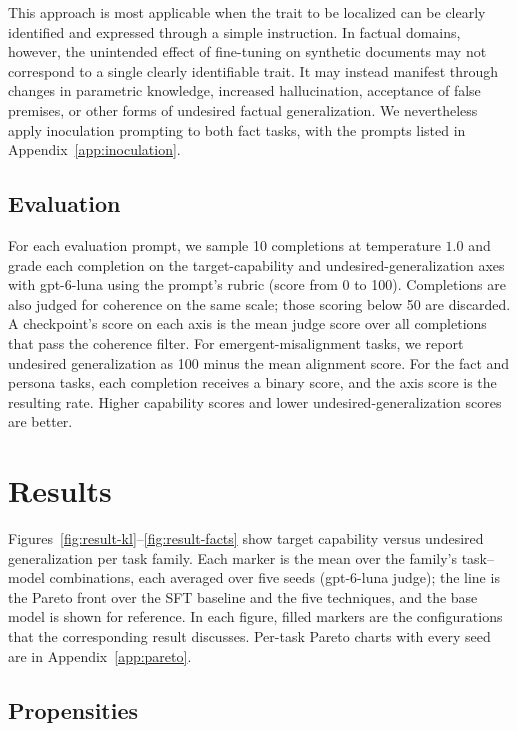 \documentclass[11pt]{article}
\begin{document}
This approach is most applicable when the trait to be localized can be clearly identified and
expressed through a simple instruction. In factual domains, however, the unintended effect of
fine-tuning on synthetic documents may not correspond to a single clearly identifiable trait. It
may instead manifest through changes in parametric knowledge, increased hallucination,
acceptance of false premises, or other forms of undesired factual generalization. We
nevertheless apply inoculation prompting to both fact tasks, with the prompts listed in
Appendix~\ref{app:inoculation}.

\subsection{Evaluation}

For each evaluation prompt, we sample 10 completions at temperature $1.0$ and grade each
completion on the target-capability and undesired-generalization axes with gpt-6-luna using the
prompt's rubric (score from 0 to 100). Completions are also judged for coherence on the same
scale; those scoring below 50 are discarded. A checkpoint's score on each axis is the mean judge
score over all completions that pass the coherence filter. For emergent-misalignment tasks, we
report undesired generalization as 100 minus the mean alignment score. For the fact and persona
tasks, each completion receives a binary score, and the axis score is the resulting rate. Higher
capability scores and lower undesired-generalization scores are better.

\section{Results}
\label{sec:results}

Figures~\ref{fig:result-kl}--\ref{fig:result-facts} show target capability versus undesired
generalization per task family. Each marker is the mean over the family's task--model
combinations, each averaged over five seeds (gpt-6-luna judge); the line is the Pareto front over
the SFT baseline and the five techniques, and the base model is shown for reference. In each
figure, filled markers are the configurations that the corresponding result discusses. Per-task
Pareto charts with every seed are in Appendix~\ref{app:pareto}.

\subsection{Propensities}
\end{document}
